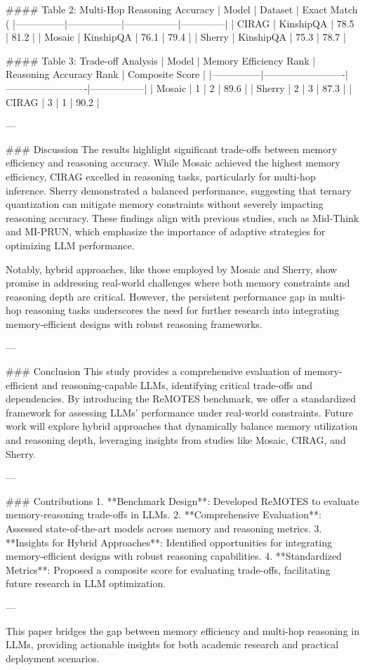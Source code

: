 #### Table 2: Multi-Hop Reasoning Accuracy  
| Model         | Dataset         | Exact Match (%
|---------------|-----------------|-----------------|--------------|  
| CIRAG         | KinshipQA       | 78.5            | 81.2         |  
| Mosaic        | KinshipQA       | 76.1            | 79.4         |  
| Sherry        | KinshipQA       | 75.3            | 78.7         |  

#### Table 3: Trade-off Analysis  
| Model         | Memory Efficiency Rank | Reasoning Accuracy Rank | Composite Score |  
|---------------|-------------------------|-------------------------|-----------------|  
| Mosaic        | 1                       | 2                       | 89.6            |  
| Sherry        | 2                       | 3                       | 87.3            |  
| CIRAG         | 3                       | 1                       | 90.2            |  

---

### Discussion  
The results highlight significant trade-offs between memory efficiency and reasoning accuracy. While Mosaic achieved the highest memory efficiency, CIRAG excelled in reasoning tasks, particularly for multi-hop inference. Sherry demonstrated a balanced performance, suggesting that ternary quantization can mitigate memory constraints without severely impacting reasoning accuracy. These findings align with previous studies, such as Mid-Think and MI-PRUN, which emphasize the importance of adaptive strategies for optimizing LLM performance.

Notably, hybrid approaches, like those employed by Mosaic and Sherry, show promise in addressing real-world challenges where both memory constraints and reasoning depth are critical. However, the persistent performance gap in multi-hop reasoning tasks underscores the need for further research into integrating memory-efficient designs with robust reasoning frameworks.

---

### Conclusion  
This study provides a comprehensive evaluation of memory-efficient and reasoning-capable LLMs, identifying critical trade-offs and dependencies. By introducing the ReMOTES benchmark, we offer a standardized framework for assessing LLMs' performance under real-world constraints. Future work will explore hybrid approaches that dynamically balance memory utilization and reasoning depth, leveraging insights from studies like Mosaic, CIRAG, and Sherry.

---

### Contributions  
1. **Benchmark Design**: Developed ReMOTES to evaluate memory-reasoning trade-offs in LLMs.  
2. **Comprehensive Evaluation**: Assessed state-of-the-art models across memory and reasoning metrics.  
3. **Insights for Hybrid Approaches**: Identified opportunities for integrating memory-efficient designs with robust reasoning capabilities.  
4. **Standardized Metrics**: Proposed a composite score for evaluating trade-offs, facilitating future research in LLM optimization.  

--- 

This paper bridges the gap between memory efficiency and multi-hop reasoning in LLMs, providing actionable insights for both academic research and practical deployment scenarios.